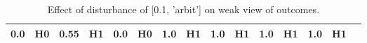 \begin{table}
\begin{tabular}{l|cc|cc|cc|cc|cc|cc|cc}
\cellcolor{Bittersweet}0.0&\cellcolor{Bittersweet}H0&\cellcolor{Bittersweet}0.55&\cellcolor{Bittersweet}H1&\cellcolor{Bittersweet}0.0&\cellcolor{Bittersweet}H0&\cellcolor{Bittersweet}1.0&\cellcolor{Bittersweet}H1&\cellcolor{Bittersweet}1.0&\cellcolor{Bittersweet}H1&\cellcolor{Bittersweet}1.0&\cellcolor{Bittersweet}H1&\cellcolor{Bittersweet}1.0&\cellcolor{Bittersweet}H1\\\bottomrule\end{tabular}\caption{Effect of disturbance of [0.1, 'arbit'] on weak view of outcomes.}\end{table}